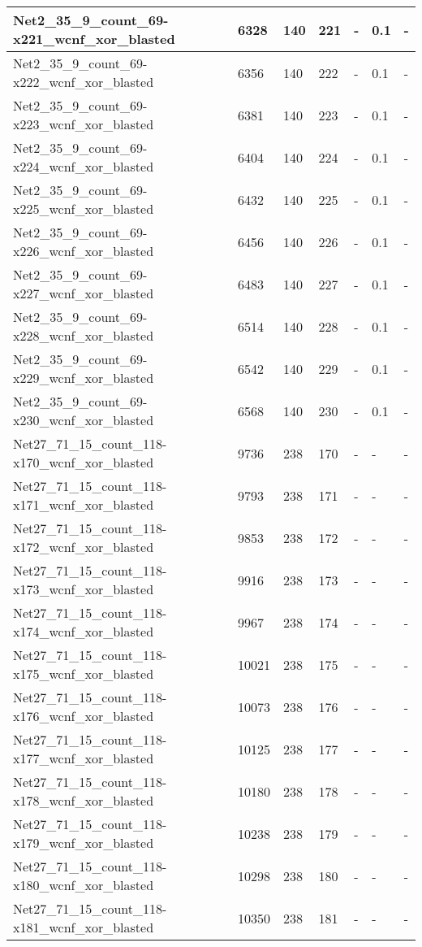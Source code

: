 \begin{scriptsize}
\begin{longtable}{|p{5cm}|l|l|l|l|l|l|}
Net2\_35\_9\_count\_69-x221\_wcnf\_xor\_blasted&6328&140&221&-&0.1&- \\ \hline 
Net2\_35\_9\_count\_69-x222\_wcnf\_xor\_blasted&6356&140&222&-&0.1&- \\ \hline 
Net2\_35\_9\_count\_69-x223\_wcnf\_xor\_blasted&6381&140&223&-&0.1&- \\ \hline 
Net2\_35\_9\_count\_69-x224\_wcnf\_xor\_blasted&6404&140&224&-&0.1&- \\ \hline 
Net2\_35\_9\_count\_69-x225\_wcnf\_xor\_blasted&6432&140&225&-&0.1&- \\ \hline 
Net2\_35\_9\_count\_69-x226\_wcnf\_xor\_blasted&6456&140&226&-&0.1&- \\ \hline 
Net2\_35\_9\_count\_69-x227\_wcnf\_xor\_blasted&6483&140&227&-&0.1&- \\ \hline 
Net2\_35\_9\_count\_69-x228\_wcnf\_xor\_blasted&6514&140&228&-&0.1&- \\ \hline 
Net2\_35\_9\_count\_69-x229\_wcnf\_xor\_blasted&6542&140&229&-&0.1&- \\ \hline 
Net2\_35\_9\_count\_69-x230\_wcnf\_xor\_blasted&6568&140&230&-&0.1&- \\ \hline 
Net27\_71\_15\_count\_118-x170\_wcnf\_xor\_blasted&9736&238&170&-&-&- \\ \hline 
Net27\_71\_15\_count\_118-x171\_wcnf\_xor\_blasted&9793&238&171&-&-&- \\ \hline 
Net27\_71\_15\_count\_118-x172\_wcnf\_xor\_blasted&9853&238&172&-&-&- \\ \hline 
Net27\_71\_15\_count\_118-x173\_wcnf\_xor\_blasted&9916&238&173&-&-&- \\ \hline 
Net27\_71\_15\_count\_118-x174\_wcnf\_xor\_blasted&9967&238&174&-&-&- \\ \hline 
Net27\_71\_15\_count\_118-x175\_wcnf\_xor\_blasted&10021&238&175&-&-&- \\ \hline 
Net27\_71\_15\_count\_118-x176\_wcnf\_xor\_blasted&10073&238&176&-&-&- \\ \hline 
Net27\_71\_15\_count\_118-x177\_wcnf\_xor\_blasted&10125&238&177&-&-&- \\ \hline 
Net27\_71\_15\_count\_118-x178\_wcnf\_xor\_blasted&10180&238&178&-&-&- \\ \hline 
Net27\_71\_15\_count\_118-x179\_wcnf\_xor\_blasted&10238&238&179&-&-&- \\ \hline 
Net27\_71\_15\_count\_118-x180\_wcnf\_xor\_blasted&10298&238&180&-&-&- \\ \hline 
Net27\_71\_15\_count\_118-x181\_wcnf\_xor\_blasted&10350&238&181&-&-&- \\ \hline 

\end{longtable}
\end{scriptsize}
